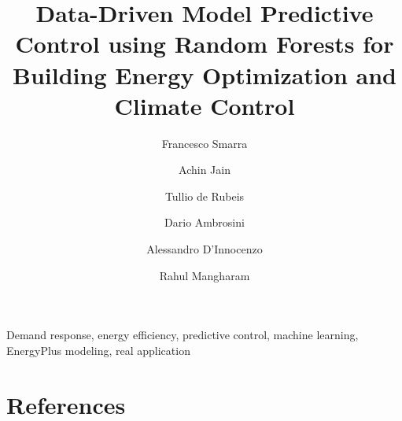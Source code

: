\documentclass[review]{elsarticle}
\begin{document}
\begin{frontmatter}

\title{\textcolor[rgb]{0,0,1}{Data-Driven Model Predictive Control using Random Forests for Building Energy Optimization and Climate Control}}

\author[FSaddress,EC]{Francesco Smarra}

\author[AJaddress,EC]{Achin Jain}
\author[TDRaddress,EC]{Tullio de Rubeis}
\author[TDRaddress]{Dario Ambrosini}
\author[FSaddress]{Alessandro D'Innocenzo}
\author[AJaddress]{Rahul Mangharam}


\address[FSaddress]{Department of Information Engineering, Computer Science and Mathematics, Universit\`{a} degli Studi dell'Aquila, L'Aquila, Italy}
\address[AJaddress]{Department of Electrical and Systems Engineering, University of Pennsylvania, Philadelphia, USA}
\address[TDRaddress]{"G. Parolini Lab" - Department of Industrial and Information Engineering and Economics, Universit\`{a} degli Studi dell'Aquila, L'Aquila, Italy}


\begin{abstract}

\end{abstract}

\begin{keyword}
Demand response, energy efficiency, predictive control, machine learning, EnergyPlus modeling, real application
\end{keyword}

\end{frontmatter}
















\section*{References}



\appendix

\end{document}
